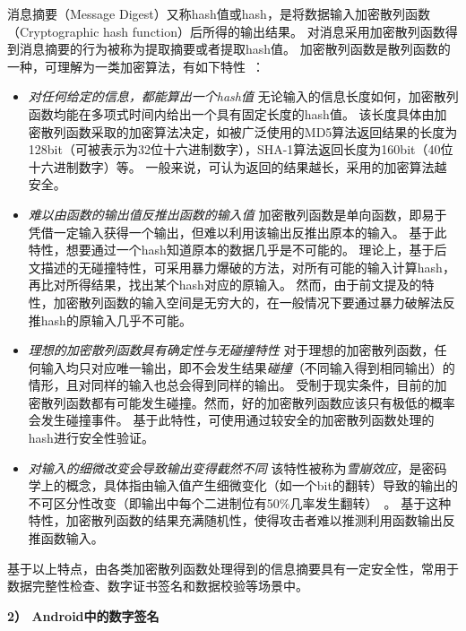 消息摘要（Message Digest）又称hash值或hash，是将数据输入加密散列函数（Cryptographic hash function）后所得的输出结果。
对消息采用加密散列函数得到消息摘要的行为被称为提取摘要或者提取hash值。
加密散列函数是散列函数的一种，可理解为一类加密算法，有如下特性~\cite{wiki_encryptographic}：
\begin{itemize}
    \setlength{\itemsep}{1pt}
    \setlength{\parskip}{0pt}
    \setlength{\parsep}{0pt}
    \item \emph{对任何给定的信息，都能算出一个hash值} \quad
	无论输入的信息长度如何，加密散列函数均能在多项式时间内给出一个具有固定长度的hash值。
	该长度具体由加密散列函数采取的加密算法决定，如被广泛使用的MD5算法返回结果的长度为128bit（可被表示为32位十六进制数字），SHA-1算法返回长度为160bit（40位十六进制数字）等。
	一般来说，可认为返回的结果越长，采用的加密算法越安全。

	\item \emph{难以由函数的输出值反推出函数的输入值} \quad
	加密散列函数是单向函数，即易于凭借一定输入获得一个输出，但难以利用该输出反推出原本的输入。
	基于此特性，想要通过一个hash知道原本的数据几乎是不可能的。
	理论上，基于后文描述的无碰撞特性，可采用暴力爆破的方法，对所有可能的输入计算hash，再比对所得结果，找出某个hash对应的原输入。
	然而，由于前文提及的特性，加密散列函数的输入空间是无穷大的，在一般情况下要通过暴力破解法反推hash的原输入几乎不可能。

	\item \emph{理想的加密散列函数具有确定性与无碰撞特性} \quad
	对于理想的加密散列函数，任何输入均只对应唯一输出，即不会发生结果\textit{碰撞}（不同输入得到相同输出）的情形，且对同样的输入也总会得到同样的输出。
	受制于现实条件，目前的加密散列函数都有可能发生碰撞。然而，好的加密散列函数应该只有极低的概率会发生碰撞事件。
	基于此特性，可使用通过较安全的加密散列函数处理的hash进行安全性验证。

	\item \emph{对输入的细微改变会导致输出变得截然不同} \quad
	该特性被称为\textit{雪崩效应}，是密码学上的概念，具体指由输入值产生细微变化（如一个bit的翻转）导致的输出的不可区分性改变（即输出中每个二进制位有50\%几率发生翻转）~\cite{feistel1973cryptography}。
	基于这种特性，加密散列函数的结果充满随机性，使得攻击者难以推测利用函数输出反推函数输入。
\end{itemize}

基于以上特点，由各类加密散列函数处理得到的信息摘要具有一定安全性，常用于数据完整性检查、数字证书签名和数据校验等场景中。

\textbf{2） Android中的数字签名}

